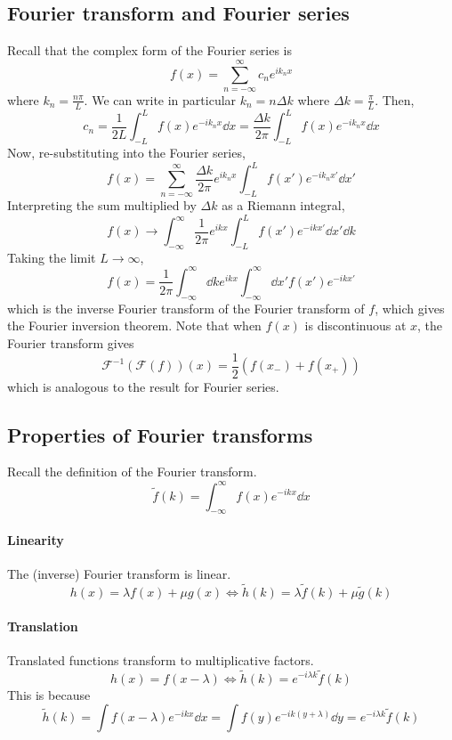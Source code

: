 \documentclass[a4paper]{article}
\begin{document}
\subsection{Fourier transform and Fourier series}
Recall that the complex form of the Fourier series is
\[
	f(x) = \sum_{n=-\infty}^\infty c_n e^{ik_n x}
\]
where \( k_n = \frac{n\pi}{L} \).
We can write in particular \( k_n = n \Delta k \) where \( \Delta k = \frac{\pi}{L} \).
Then,
\[
	c_n = \frac{1}{2L} \int_{-L}^L f(x) e^{-ik_n x} \dd{x} = \frac{\Delta k}{2\pi} \int_{-L}^L f(x) e^{-ik_n x}\dd{x}
\]
Now, re-substituting into the Fourier series,
\[
	f(x) = \sum_{n=-\infty}^\infty \frac{\Delta k}{2\pi} e^{i k_n x} \int_{-L}^L f(x') e^{-ik_n x'} \dd{x'}
\]
Interpreting the sum multiplied by \( \Delta k \) as a Riemann integral,
\[
	f(x) \to \int_{-\infty}^\infty \frac{1}{2\pi} e^{i k x} \int_{-L}^L f(x') e^{-ik x'} \dd{x'} \dd{k}
\]
Taking the limit \( L \to \infty \),
\[
	f(x) = \frac{1}{2\pi} \int_{-\infty}^\infty \dd{k} e^{i k x} \int_{-\infty}^\infty \dd{x'} f(x') e^{-ik x'}
\]
which is the inverse Fourier transform of the Fourier transform of \( f \), which gives the Fourier inversion theorem.
Note that when \( f(x) \) is discontinuous at \( x \), the Fourier transform gives
\[
	\mathcal F^{-1}(\mathcal F(f))(x) = \frac{1}{2}(f(x_-) + f(x_+))
\]
which is analogous to the result for Fourier series.

\subsection{Properties of Fourier transforms}
Recall the definition of the Fourier transform.
\[
	\widetilde f(k) = \int_{-\infty}^\infty f(x) e^{-ikx} \dd{x}
\]
\paragraph{Linearity} The (inverse) Fourier transform is linear.
\[
	h(x) = \lambda f(x) + \mu g(x) \iff \widetilde h(k) = \lambda \widetilde f(k) + \mu \widetilde g(k)
\]

\paragraph{Translation} Translated functions transform to multiplicative factors.
\[
	h(x) = f(x - \lambda) \iff \widetilde h(k) = e^{-i\lambda k} \widetilde f(k)
\]
This is because
\[
	\widetilde h(k) = \int f(x - \lambda) e^{-ikx} \dd{x} = \int f(y) e^{-ik(y + \lambda)} \dd{y} = e^{-i\lambda k} \widetilde f(k)
\]
\end{document}

